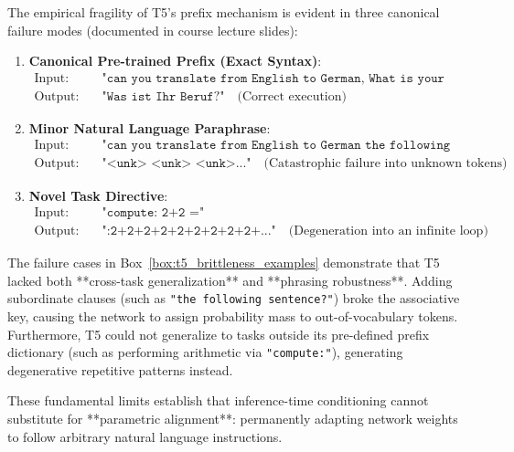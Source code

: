 \documentclass[../../main.tex]{subfiles}
\begin{document}
\begin{tcolorbox}[colback=cardBg,colframe=cardLine,arc=2pt,boxrule=0.5pt,title=\textbf{Pedagogical Example: T5 Prompt Brittleness and Format Fragility}]
\label{box:t5_brittleness_examples}
The empirical fragility of T5's prefix mechanism is evident in three canonical failure modes (documented in course lecture slides):
\begin{enumerate}
    \item \textbf{Canonical Pre-trained Prefix (Exact Syntax)}:
    \begin{align*}
    \text{Input:} & \quad \texttt{"can you translate from English to German, What is your profession?"} \\
    \text{Output:} & \quad \texttt{"Was ist Ihr Beruf?"} \quad \text{(Correct execution)}
    \end{align*}
    \item \textbf{Minor Natural Language Paraphrase}:
    \begin{align*}
    \text{Input:} & \quad \texttt{"can you translate from English to German the following sentence? What is your profession?"} \\
    \text{Output:} & \quad \texttt{"<unk> <unk> <unk>..."} \quad \text{(Catastrophic failure into unknown tokens)}
    \end{align*}
    \item \textbf{Novel Task Directive}:
    \begin{align*}
    \text{Input:} & \quad \texttt{"compute: 2+2 ="} \\
    \text{Output:} & \quad \texttt{":2+2+2+2+2+2+2+2+2+..."} \quad \text{(Degeneration into an infinite loop)}
    \end{align*}
\end{enumerate}
\end{tcolorbox}

The failure cases in Box~\ref{box:t5_brittleness_examples} demonstrate that T5 lacked both **cross-task generalization** and **phrasing robustness**. Adding subordinate clauses (such as \texttt{"the following sentence?"}) broke the associative key, causing the network to assign probability mass to out-of-vocabulary tokens. Furthermore, T5 could not generalize to tasks outside its pre-defined prefix dictionary (such as performing arithmetic via \texttt{"compute:"}), generating degenerative repetitive patterns instead.

These fundamental limits establish that inference-time conditioning cannot substitute for **parametric alignment**: permanently adapting network weights to follow arbitrary natural language instructions.
\end{document}
